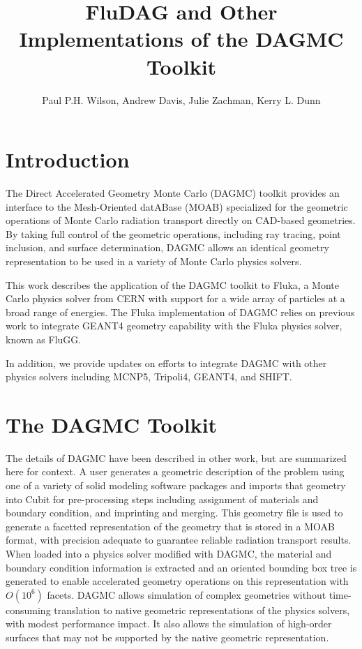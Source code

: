 \documentclass{anstrans}
\title{FluDAG and Other Implementations of the DAGMC Toolkit}
\author{Paul P.H. Wilson, Andrew Davis, Julie Zachman, Kerry L. Dunn}
\institute{University of Wisconsin-Madison, 1500 Engineering Dr,
  Madison, WI 53706}
\begin{document}
\section{Introduction}

The Direct Accelerated Geometry Monte Carlo (DAGMC) toolkit provides
an interface to the Mesh-Oriented datABase (MOAB)\cite{MOAB} specialized for the
geometric operations of Monte Carlo radiation transport directly on
CAD-based geometries.  By taking full control of the geometric
operations, including ray tracing, point inclusion, and surface
determination, DAGMC allows an identical geometry representation to be
used in a variety of Monte Carlo physics solvers.

This work describes the application of the DAGMC toolkit to
Fluka\cite{fluka}, a Monte Carlo physics solver from CERN with support
for a wide array of particles at a broad range of energies.  The Fluka
implementation of DAGMC relies on previous work to integrate
GEANT4\cite{GEANT4} geometry capability with the Fluka physics solver,
known as FluGG\cite{flugg}.






In addition, we provide updates on efforts to integrate DAGMC with
other physics solvers including MCNP5\cite{mcnp5},
Tripoli4\cite{tripoli}, GEANT4, and SHIFT\cite{shift}.

\section{The DAGMC Toolkit}

The details of DAGMC have been described in other work, but are
summarized here for context.  A user generates a geometric description
of the problem using one of a variety of solid modeling software
packages and imports that geometry into Cubit\cite{cubit} for
pre-processing steps including assignment of materials and boundary
condition, and imprinting and merging.  This geometry file is used to
generate a facetted representation of the geometry that is stored in a
MOAB format, with precision adequate to guarantee reliable radiation
transport results\cite{snouffer_ans}.  When loaded into a physics solver
modified with DAGMC, the material and boundary condition information
is extracted and an oriented bounding box tree is generated to enable
accelerated geometry operations on this representation with $O(10^6)$
facets.  DAGMC allows simulation of complex geometries without
time-consuming translation to native geometric representations of the
physics solvers, with modest performance impact.  It also allows the
simulation of high-order surfaces that may not be supported by the
native geometric representation.
\end{document}
